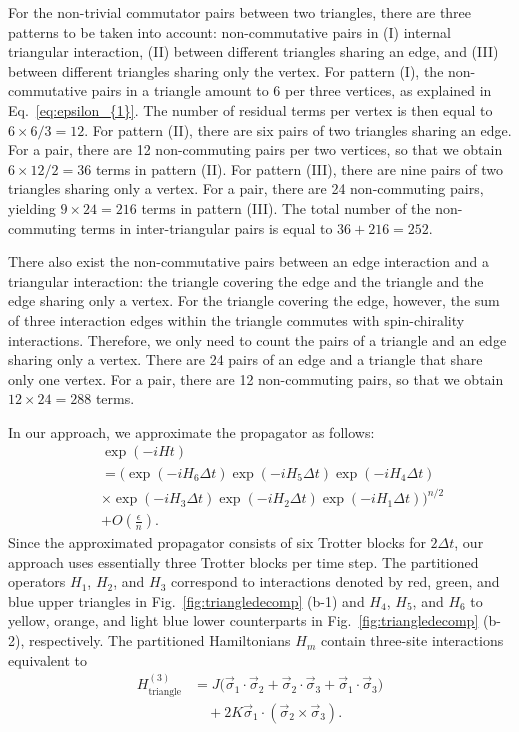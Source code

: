 \documentclass[aps,showpacs,amsmath,amssymb,twocolumn,prx,longbibliography,superscriptaddress,notitlepage,floatfix,10pt]{revtex4-2}
\begin{document}
For the non-trivial commutator pairs between two triangles, there are three patterns to be taken into account: non-commutative pairs in (I) internal triangular interaction, (II) 
between different triangles sharing an edge, and (III) between different triangles sharing only the vertex. For pattern (I), the non-commutative pairs in a triangle amount to 6 per three vertices, as explained in Eq.~\eqref{eq:epsilon_{1}}. The number of residual terms per vertex is then equal to $6\times6/3=12$. For pattern (II), there are six pairs of two triangles sharing an edge. For a pair, there are 12 non-commuting pairs per two vertices, so that we obtain $6\times12/2=36$ terms in pattern (II). For pattern (III), there are nine pairs of two triangles sharing only a vertex. For a pair, there are 24 non-commuting pairs, yielding $9\times24=216$ terms in pattern (III). The total number of the non-commuting terms in inter-triangular pairs is equal to $36+216=252$.

There also exist the non-commutative pairs between an edge interaction and a triangular interaction: the triangle covering the edge and the triangle and the edge sharing only a vertex. For the triangle covering the edge, however, the sum of three interaction edges within the triangle commutes with spin-chirality interactions. Therefore, we only need to count the pairs of a triangle and an edge sharing only a vertex. There are 24 pairs of an edge and a triangle that share only one vertex. For a pair, there are 12 non-commuting pairs, so that we obtain $12\times24=288$ terms.

In our approach, we approximate the propagator as follows:
\begin{equation}
\begin{split}
    &\exp(-iHt)\\
    &=\bigl(\exp(-iH_{6}\Delta t)\exp(-iH_{5}\Delta t)\exp(-iH_{4}\Delta t)\\\quad&\times\exp(-iH_{3}\Delta t)\exp(-iH_{2}\Delta t)\exp(-iH_{1}\Delta t)\bigr)^{n/2}\\
    \quad &+O\left(\frac{\epsilon}{n}\right).\label{eq:Trotter_triangle}
\end{split}
\end{equation}
Since the approximated propagator consists of six Trotter blocks for $2\Delta t$, our approach uses essentially three Trotter blocks per time step.
The partitioned operators $H_{1}$, $H_{2}$, and $H_{3}$ correspond to interactions denoted by red, green, and blue upper triangles in Fig.~\ref{fig:triangledecomp} (b-1) and $H_{4}$, $H_5$, and $H_6$ to yellow, orange, and light blue lower counterparts in Fig.~\ref{fig:triangledecomp} (b-2), respectively. The partitioned Hamiltonians $H_m$ contain three-site interactions equivalent to 
\begin{equation}
\begin{split}
    H_{\mathrm{triangle}}^{(3)}&=J\bigl(\vec{\sigma}_{1}\cdot\vec{\sigma}_{2}+\vec{\sigma}_{2}\cdot\vec{\sigma}_{3}+\vec{\sigma}_{1}\cdot\vec{\sigma}_{3}\bigr)\\
&\quad+2K\vec{\sigma}_{1}\cdot\left(\vec{\sigma}_{2}\times\vec{\sigma}_{3}\right).    
\end{split}
\end{equation}
\end{document}
